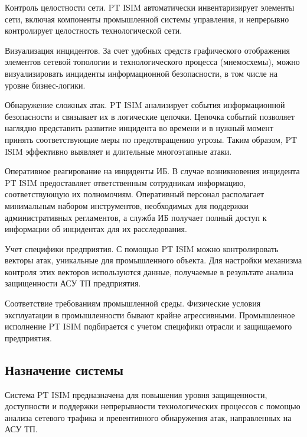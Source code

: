 Контроль целостности сети. PT ISIM автоматически инвентаризирует элементы сети, включая компоненты промышленной системы управления, и непрерывно контролирует целостность технологической сети.\par

­Визуализация инцидентов. За счет удобных средств графического отображения элементов сетевой топологии и технологического процесса (мнемосхемы), можно визуализировать инциденты информационной безопасности, в том числе на уровне бизнес-логики.\par

Обнаружение сложных атак. PT ISIM анализирует события информационной безопасности и связывает их в логические цепочки. Цепочка событий позволяет наглядно представить развитие инцидента во времени и в нужный момент принять соответствующие меры по предотвращению угрозы. Таким образом, PT ISIM эффективно выявляет и длительные многоэтапные атаки.\par

Оперативное реагирование на инциденты ИБ. В случае возникновения инцидента PT ISIM предоставляет ответственным сотрудникам информацию, соответствующую их полномочиям. Оперативный персонал располагает минимальным набором инструментов, необходимых для поддержки административных регламентов, а служба ИБ получает полный доступ к информации об инцидентах для их расследования.\par

Учет специфики предприятия. С помощью PT ISIM можно контролировать векторы атак, уникальные для промышленного объекта. Для настройки механизма контроля этих векторов используются данные, получаемые в результате анализа защищенности АСУ ТП предприятия.\par

Соответствие требованиям промышленной среды. Физические условия эксплуатации в промышленности бывают крайне агрессивными. Промышленное исполнение PT ISIM подбирается с учетом специфики отрасли и защищаемого предприятия.\\

\subsection{Назначение системы}

Система PT ISIM предназначена для повышения уровня защищенности, доступности и поддержки непрерывности технологических процессов с помощью анализа сетевого трафика и превентивного обнаружения атак, направленных на АСУ ТП.\par


